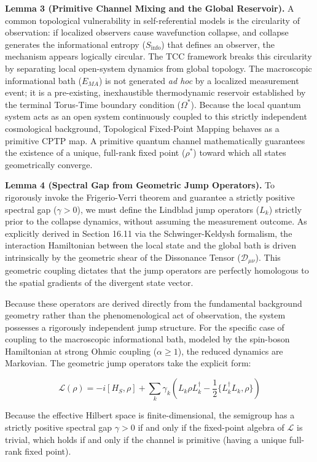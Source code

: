 \documentclass[12pt,openany]{book}
\theoremstyle{plain}
\theoremstyle{definition}
\theoremstyle{remark}
\begin{document}
\textbf{Lemma 3 (Primitive Channel Mixing and the Global Reservoir).} A common topological vulnerability in self-referential models is the circularity of observation: if localized observers cause wavefunction collapse, and collapse generates the informational entropy ($S_{\text{info}}$) that defines an observer, the mechanism appears logically circular. The TCC framework breaks this circularity by separating local open-system dynamics from global topology. The macroscopic informational bath ($E_{MA}$) is not generated \textit{ad hoc} by a localized measurement event; it is a pre-existing, inexhaustible thermodynamic reservoir established by the terminal Torus-Time boundary condition ($\Omega^*$). Because the local quantum system acts as an open system continuously coupled to this strictly independent cosmological background, Topological Fixed-Point Mapping behaves as a primitive CPTP map. A primitive quantum channel mathematically guarantees the existence of a unique, full-rank fixed point ($\rho^*$) toward which all states geometrically converge.

\textbf{Lemma 4 (Spectral Gap from Geometric Jump Operators).} To rigorously invoke the Frigerio-Verri theorem and guarantee a strictly positive spectral gap ($\gamma > 0$), we must define the Lindblad jump operators ($L_k$) strictly prior to the collapse dynamics, without assuming the measurement outcome. As explicitly derived in Section 16.11 via the Schwinger-Keldysh formalism, the interaction Hamiltonian between the local state and the global bath is driven intrinsically by the geometric shear of the Dissonance Tensor ($\mathcal{D}_{\mu\nu}$). This geometric coupling dictates that the jump operators are perfectly homologous to the spatial gradients of the divergent state vector. 

Because these operators are derived directly from the fundamental background geometry rather than the phenomenological act of observation, the system possesses a rigorously independent jump structure. For the specific case of coupling to the macroscopic informational bath, modeled by the spin-boson Hamiltonian at strong Ohmic coupling ($\alpha \ge 1$), the reduced dynamics are Markovian. The geometric jump operators take the explicit form:

$$\mathcal{L}(\rho) = -i[H_S, \rho] + \sum_k \gamma_k \left(L_k \rho L_k^\dagger - \frac{1}{2}\{L_k^\dagger L_k, \rho\}\right)$$

Because the effective Hilbert space is finite-dimensional, the semigroup has a strictly positive spectral gap $\gamma > 0$ if and only if the fixed-point algebra of $\mathcal{L}$ is trivial, which holds if and only if the channel is primitive (having a unique full-rank fixed point).
\end{document}
